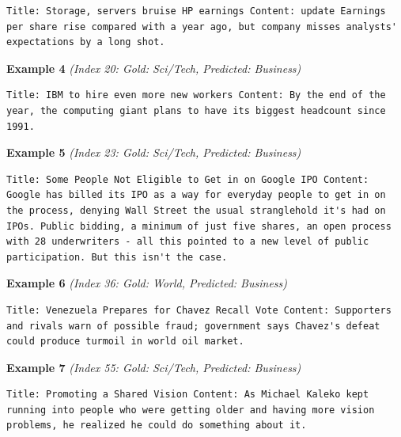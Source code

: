 \begin{Verbatim}[breaklines=true,breakanywhere=true,fontsize=\small]
Title: Storage, servers bruise HP earnings Content: update Earnings per share rise compared with a year ago, but company misses analysts' expectations by a long shot.
\end{Verbatim}

\noindent
\textbf{Example 4} \quad \textit{(Index 20: Gold: Sci/Tech, Predicted: Business)}

\begin{Verbatim}[breaklines=true,breakanywhere=true,fontsize=\small]
Title: IBM to hire even more new workers Content: By the end of the year, the computing giant plans to have its biggest headcount since 1991.
\end{Verbatim}

\noindent
\textbf{Example 5} \quad \textit{(Index 23: Gold: Sci/Tech, Predicted: Business)}

\begin{Verbatim}[breaklines=true,breakanywhere=true,fontsize=\small]
Title: Some People Not Eligible to Get in on Google IPO Content: Google has billed its IPO as a way for everyday people to get in on the process, denying Wall Street the usual stranglehold it's had on IPOs. Public bidding, a minimum of just five shares, an open process with 28 underwriters - all this pointed to a new level of public participation. But this isn't the case.
\end{Verbatim}

\noindent
\textbf{Example 6} \quad \textit{(Index 36: Gold: World, Predicted: Business)}

\begin{Verbatim}[breaklines=true,breakanywhere=true,fontsize=\small]
Title: Venezuela Prepares for Chavez Recall Vote Content: Supporters and rivals warn of possible fraud; government says Chavez's defeat could produce turmoil in world oil market.
\end{Verbatim}

\noindent
\textbf{Example 7} \quad \textit{(Index 55: Gold: Sci/Tech, Predicted: Business)}

\begin{Verbatim}[breaklines=true,breakanywhere=true,fontsize=\small]
Title: Promoting a Shared Vision Content: As Michael Kaleko kept running into people who were getting older and having more vision problems, he realized he could do something about it.
\end{Verbatim}

